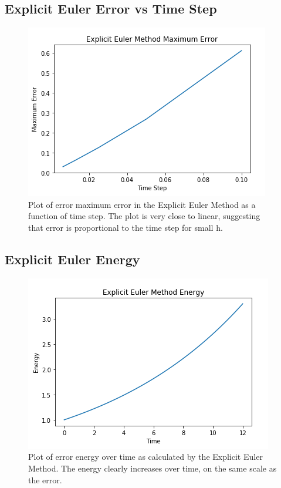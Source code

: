 \documentclass{article}
\begin{document}
\subsection{Explicit Euler Error vs Time Step}

\begin{figure}[h!]
\centering
\includegraphics[scale=0.35]{exp_euler_max_err.png}
\caption{Plot of error maximum error in the Explicit Euler Method as a function of time step. The plot is very close to linear, suggesting that error is proportional to the time step for small h.}
\label{fig:expeulermaxerr}
\end{figure}

\subsection{Explicit Euler Energy}

\begin{figure}[h!]
\centering
\includegraphics[scale=0.35]{exp_euler_energy.png}
\caption{Plot of error energy over time as calculated by the Explicit Euler Method. The energy clearly increases over time, on the same scale as the error.}
\label{fig:expeulerenergy}
\end{figure}
\end{document}
